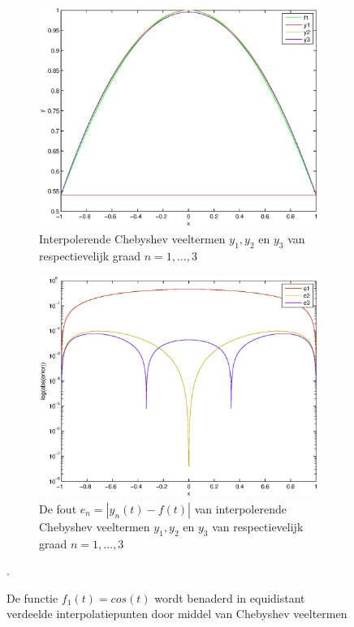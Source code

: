 \documentclass[a4paper]{article}
\begin{document}
\begin{figure}
    \centering
    \begin{subfigure}[t]{0.45\textwidth}
        \centering
        \includegraphics[width=\textwidth]{Jona/linspace_cos_interpolation.eps}
        \caption{Interpolerende Chebyshev veeltermen $y_{1},y_{2}$ en $y_{3}$ van respectievelijk graad $n=1,\dots,3$}
        \label{fig:lin_cos_interpol}
        \vspace*{1cm}
    \end{subfigure}
    \begin{subfigure}[t]{0.45\textwidth}
        \centering
        \includegraphics[width=\textwidth]{Jona/linspace_cos_error.eps}
        \caption{De fout $e_{n} = |y_{n}(t)-f(t)|$ van interpolerende Chebyshev veeltermen $y_{1},y_{2}$ en $y_{3}$ van respectievelijk graad $n=1,\dots,3$}
        \label{fig:lin_cos_error}
    \end{subfigure}
    \hfill
    \caption{De functie $f_{1}(t) = cos(t)$ wordt benaderd in equidistant verdeelde interpolatiepunten door middel van Chebyshev veeltermen}\label{fig:lin_cos}.
\end{figure}
\end{document}
